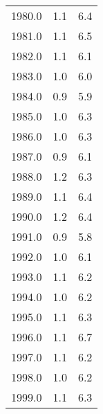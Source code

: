 \begin{tabular}{ccc}
\hline
1980.0 & 1.1 & 6.4 \\
1981.0 & 1.1 & 6.5 \\
1982.0 & 1.1 & 6.1 \\
1983.0 & 1.0 & 6.0 \\
1984.0 & 0.9 & 5.9 \\
1985.0 & 1.0 & 6.3 \\
1986.0 & 1.0 & 6.3 \\
1987.0 & 0.9 & 6.1 \\
1988.0 & 1.2 & 6.3 \\
1989.0 & 1.1 & 6.4 \\
1990.0 & 1.2 & 6.4 \\
1991.0 & 0.9 & 5.8 \\
1992.0 & 1.0 & 6.1 \\
1993.0 & 1.1 & 6.2 \\
1994.0 & 1.0 & 6.2 \\
1995.0 & 1.1 & 6.3 \\
1996.0 & 1.1 & 6.7 \\
1997.0 & 1.1 & 6.2 \\
1998.0 & 1.0 & 6.2 \\
1999.0 & 1.1 & 6.3 \\
\hline
\end{tabular}

